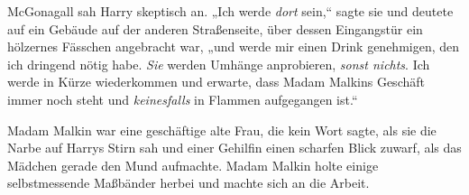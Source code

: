 McGonagall sah Harry skeptisch an. „Ich werde \emph{dort} sein,“ sagte sie und deutete auf ein Gebäude auf der anderen Straßenseite, über dessen Eingangstür ein hölzernes Fässchen angebracht war, „und werde mir einen Drink genehmigen, den ich dringend nötig habe. \emph{Sie} werden Umhänge anprobieren, \emph{sonst nichts}. Ich werde in Kürze wiederkommen und erwarte, dass Madam Malkins Geschäft immer noch steht und \emph{keinesfalls} in Flammen aufgegangen ist.“

Madam Malkin war eine geschäftige alte Frau, die kein Wort sagte, als sie die Narbe auf Harrys Stirn sah und einer Gehilfin einen scharfen Blick zuwarf, als das Mädchen gerade den Mund aufmachte. Madam Malkin holte einige selbstmessende Maßbänder herbei und machte sich an die Arbeit.


